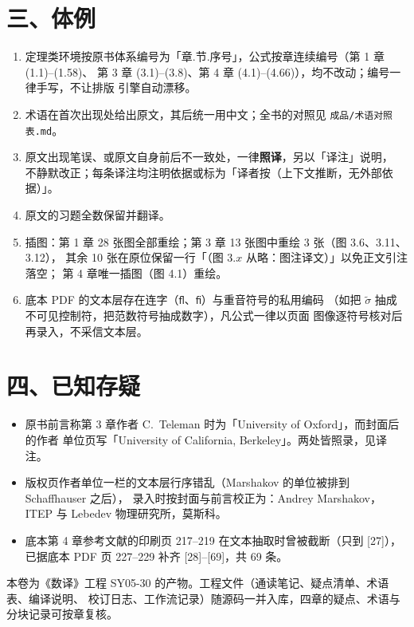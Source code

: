 \section*{三、体例}

\begin{enumerate}[label=\arabic*., leftmargin=2.2em, itemsep=0.15em]
\item 定理类环境按原书体系编号为「章.节.序号」，公式按章连续编号（第 1 章 (1.1)--(1.58)、
      第 3 章 (3.1)--(3.8)、第 4 章 (4.1)--(4.66)），均不改动；编号一律手写，不让排版
      引擎自动漂移。
\item 术语在首次出现处给出原文，其后统一用中文；全书的对照见 \texttt{成品/术语对照表.md}。
\item 原文出现笔误、或原文自身前后不一致处，一律\textbf{照译}，另以「译注」说明，
      不静默改正；每条译注均注明依据或标为「译者按（上下文推断，无外部依据）」。
\item 原文的习题全数保留并翻译。
\item 插图：第 1 章 28 张图全部重绘；第 3 章 13 张图中重绘 3 张（图 3.6、3.11、3.12），
      其余 10 张在原位保留一行「（图 3.$x$ 从略：图注译文）」以免正文引注落空；
      第 4 章唯一插图（图 4.1）重绘。
\item 底本 PDF 的文本层存在连字（\texttt{ﬂ}、\texttt{ﬁ}）与重音符号的私用编码
      （如把 $\tilde\sigma$ 抽成不可见控制符，把范数符号抽成数字），凡公式一律以页面
      图像逐符号核对后再录入，不采信文本层。
\end{enumerate}

\section*{四、已知存疑}

\begin{itemize}[leftmargin=1.6em, itemsep=0.2em]
\item 原书前言称第 3 章作者 C.~Teleman 时为「University of Oxford」，而封面后的作者
      单位页写「University of California, Berkeley」。两处皆照录，见译注。
\item 版权页作者单位一栏的文本层行序错乱（Marshakov 的单位被排到 Schaffhauser 之后），
      录入时按封面与前言校正为：Andrey Marshakov，ITEP 与 Lebedev 物理研究所，莫斯科。
\item 底本第 4 章参考文献的印刷页 217--219 在文本抽取时曾被截断（只到 [27]），
      已据底本 PDF 页 227--229 补齐 [28]--[69]，共 69 条。
\end{itemize}

\begin{annote}
本卷为《数译》工程 SY05-30 的产物。工程文件（通读笔记、疑点清单、术语表、编译说明、
校订日志、工作流记录）随源码一并入库，四章的疑点、术语与分块记录可按章复核。
\end{annote}
